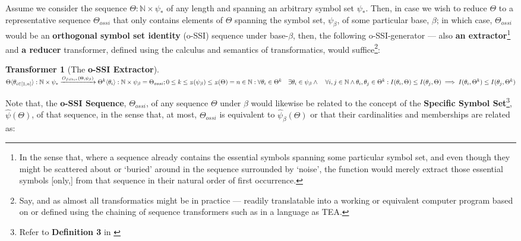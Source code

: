 \documentclass[11pt,a4paper]{article}
\newtheorem{transf}{Transformer}
\newcommand{\invpi}[1]{\mathop{\rotatebox[origin=c]{180}{$\pi$}}#1}
\begin{document}
Assume we consider the sequence $\Theta: \mathbb{N} \times \psi_*$ of any length and spanning an arbitrary symbol set $\psi_*$. Then, in case we wish to reduce $\Theta$ to a representative sequence $\Theta_{ossi}$ that only contains elements of $\Theta$ spanning the symbol set, $\psi_\beta$, of some particular base, $\beta$; in which case, $\Theta_{ossi}$ would be an \textbf{orthogonal symbol set identity} (o-SSI) sequence under base-$\beta$, then, the following o-SSI-generator --- also \textbf{an extractor}\footnote{In the sense that, where a sequence already contains the essential symbols spanning some particular symbol set, and even though they might be scattered about or `buried' around in the sequence surrounded by `noise', the function would merely extract those essential symbols [only,] from that sequence in their natural order of first occurrence.} and \textbf{a reducer} transformer, defined using the calculus and semantics of transformatics, would suffice\footnote{Say, and as almost all transformatics might be in practice --- readily translatable into a working or equivalent computer program based on or defined using the chaining of sequence transformers such as in a language as TEA\cite{cli_tttt}.}:\\


\begin{transf}[The \textbf{o-SSI Extractor}]
\label{TRANSFOSSI}
$\Theta \langle \theta_{i \in [1,n]} \rangle: \mathbb{N} \times \psi_*  \xrightarrow{O_{filter}(\Theta,\psi_\beta)} \Theta^k \langle \theta_i \rangle : \mathbb{N} \times \psi_\beta = \Theta_{ossi};\\ 0 \leq k \leq \invpi(\psi_\beta) \leq \invpi(\Theta) = n \in \mathbb{N} : \forall \theta_i \in \Theta^k \quad \exists \theta_i \in \psi_\beta \quad\\
\land \quad \forall i,j \in \mathbb{N} \land \theta_i, \theta_j \in \Theta^k: I(\theta_i,\Theta) \leq I(\theta_j,\Theta) \implies I(\theta_i,\Theta^k) \leq I(\theta_j,\Theta^k) $\\
\end{transf}


Note that, the \textbf{o-SSI Sequence}, $\Theta_{ossi}$, of any sequence $\Theta$ under $\beta$ would likewise be related to the concept of the \textbf{Specific Symbol Set}\footnote{Refer to \textbf{Definition 3} in \cite{ossipaper}}, $\hat{\psi}(\Theta)$, of that sequence, in the sense that, at most, $\Theta_{ossi}$ is equivalent to $\hat{\psi}_\beta(\Theta)$  or that their cardinalities and memberships are related as:
\end{document}
